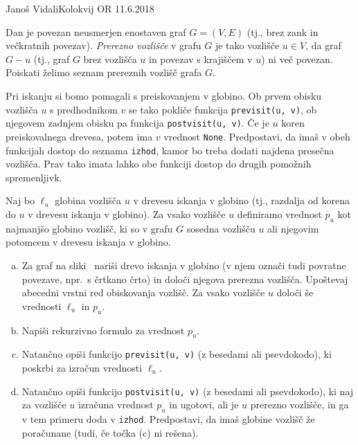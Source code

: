 \begin{naloga}{Janoš Vidali}{Kolokvij OR 11.6.2018}
\begin{vprasanje}[prerezna]
Dan je povezan neusmerjen enostaven graf $G = (V, E)$
(tj., brez zank in večkratnih povezav).
{\em Prerezno vozlišče} v grafu $G$ je tako vozlišče $u \in V$,
da graf $G - u$
(tj., graf $G$ brez vozlišča $u$ in povezav s krajiščem v $u$)
ni več povezan.
Poiskati želimo seznam prereznih vozlišč grafa $G$.

Pri iskanju si bomo pomagali s preiskovanjem v globino.
Ob prvem obisku vozlišča $u$ s predhodnikom $v$
se tako pokliče funkcija \verb|previsit(u, v)|,
ob njegovem zadnjem obisku pa funkcija \verb|postvisit(u, v)|.
Če je $u$ koren preiskovalnega drevesa, potem ima $v$ vrednost \verb|None|.
Predpostavi, da imaš v obeh funkcijah dostop do seznama \verb|izhod|,
kamor bo treba dodati najdena presečna vozlišča.
Prav tako imata lahko obe funkciji dostop do drugih pomožnih spremenljivk.

Naj bo $\ell_u$ globina vozlišča $u$ v drevesu iskanja v globino
(tj., razdalja od korena do $u$ v drevesu iskanja v globino).
Za vsako vozlišče $u$ definiramo vrednost $p_u$ kot najmanjšo globino vozlišč,
ki so v grafu $G$ sosedna vozlišču $u$
ali njegovim potomcem v drevesu iskanja v globino.

\begin{enumerate}[(a)]
\item Za graf na sliki~\fig{} nariši drevo iskanja v globino
(v njem označi tudi povratne povezave, npr.~s črtkano črto)
in določi njegova prerezna vozlišča.
Upoštevaj abecedni vrstni red obiskovanja vozlišč.
Za vsako vozlišče $u$ določi še vrednosti $\ell_u$ in $p_u$.

\item Napiši rekurzivno formulo za vrednost $p_u$.

\item Natančno opiši funkcijo \verb|previsit(u, v)|
(z besedami ali psevdokodo),
ki poskrbi za izračun vrednosti $\ell_u$.

\item Natančno opiši funkcijo \verb|postvisit(u, v)|
(z besedami ali psevdokodo),
ki naj za vozlišče $u$ izračuna vrednost $p_u$ in ugotovi,
ali je $u$ prerezno vozlišče, in ga v tem primeru doda v \verb|izhod|.
Predpostavi, da imaš globine vozlišč že poračunane
(tudi, če točka (c) ni rešena).


\end{enumerate}
\end{vprasanje}
\end{naloga}
